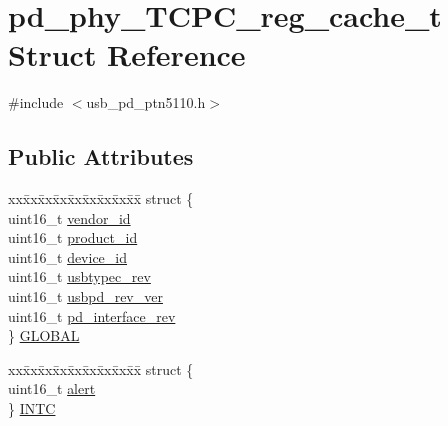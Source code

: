 \hypertarget{structpd__phy__TCPC__reg__cache__t}{\section{pd\-\_\-phy\-\_\-\-T\-C\-P\-C\-\_\-reg\-\_\-cache\-\_\-t Struct Reference}
\label{structpd__phy__TCPC__reg__cache__t}
}


{\ttfamily \#include $<$usb\-\_\-pd\-\_\-ptn5110.\-h$>$}

\subsection*{Public Attributes}
\begin{DoxyCompactItemize}
\item 
\begin{tabbing}
xx\=xx\=xx\=xx\=xx\=xx\=xx\=xx\=xx\=\kill
struct \{\\
\>uint16\_t \hyperlink{structpd__phy__TCPC__reg__cache__t_a7b91c3334783aadd61b12c07d39f1608}{vendor\_id}\\
\>uint16\_t \hyperlink{structpd__phy__TCPC__reg__cache__t_aa13da5b6b5bbc6b617ae6a2f6ad137a0}{product\_id}\\
\>uint16\_t \hyperlink{structpd__phy__TCPC__reg__cache__t_ac49c5c8089375e3a01b0270d65ba2e60}{device\_id}\\
\>uint16\_t \hyperlink{structpd__phy__TCPC__reg__cache__t_a2cd2900c5aef66e22ca024e5b309189e}{usbtypec\_rev}\\
\>uint16\_t \hyperlink{structpd__phy__TCPC__reg__cache__t_aba321c96f64c0adefd04cefc3212d658}{usbpd\_rev\_ver}\\
\>uint16\_t \hyperlink{structpd__phy__TCPC__reg__cache__t_af8fe5685e301deeecddcfa7b111dba39}{pd\_interface\_rev}\\
\} \hyperlink{structpd__phy__TCPC__reg__cache__t_a0f3d76756d4ae848200a50d75bb6d18d}{GLOBAL}\\

\end{tabbing}\item 
\begin{tabbing}
xx\=xx\=xx\=xx\=xx\=xx\=xx\=xx\=xx\=\kill
struct \{\\
\>uint16\_t \hyperlink{structpd__phy__TCPC__reg__cache__t_aa3d6f1264968fb73c640d2f2c5f77c35}{alert}\\
\} \hyperlink{structpd__phy__TCPC__reg__cache__t_a42962740ed9a333c3853192e062b0da6}{INTC}\\


\end{tabbing}
\end{DoxyCompactItemize}
